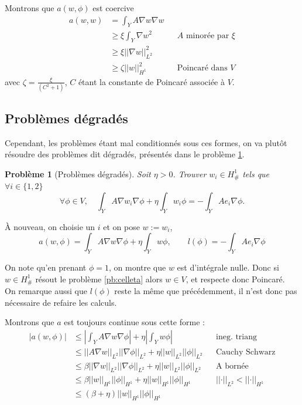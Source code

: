 \documentclass[11pt]{article}
\newtheorem{pb}{Problème}
\newcommand{\norm}[1]{\left|\left|#1\right|\right|}
\newcommand{\Hd}{H^1_{\#}}
\begin{document}
Montrons que $a(w, \phi)$ est coercive
\begin{align*}
  a(w,w) &= \int_Y A \nabla w  \nabla w \\
         &\geq \xi \int_Y \nabla w^2  && \text{$A$ minorée par $\xi$}\\
         &\geq \xi \norm{\nabla w}^2_{L^2} \\
         &\geq \zeta \norm{w}^2_{H^1} && \text{Poincaré dans $V$} 
\end{align*}
avec $\zeta = \frac{\xi}{(C^2+1)}$, $C$ étant la constante de Poincaré associée à $V$.

\subsection{Problèmes dégradés}

Cependant, les problèmes étant mal conditionnés sous ces formes, on va plutôt résoudre des problèmes dit dégradés, présentés dans le problème
\ref{pb:celleta}.

\begin{pb}[Problèmes dégradés]
  \label{pb:celleta}
  Soit $\eta>0$. Trouver $w_i \in \Hd$ tels que $\forall i \in \{1,2\}$
  \begin{equation}
    \forall \phi \in V, \quad \int_Y A \nabla w_i \nabla \phi + \eta \int_Y w_i \phi = - \int_Y A e_i \nabla \phi.
  \end{equation}
\end{pb}

À nouveau, on choisie un $i$ et on pose $w:=w_i$, 
\[
  a(w,\phi) = \int_Y A \nabla w \nabla \phi + \eta \int_Y w \phi, \qquad
  l(\phi) = -\int_Y A e_i \nabla \phi
\]

On note qu'en prenant $\phi=1$, on montre que $w$ est d'intégrale nulle. Donc si $w\in\Hd$ résout le problème  \autoref{pb:celleta} alors $w\in V$, et respecte donc Poincaré.  \\
On remarque aussi que $l(\phi)$ reste la même que précédemment, il n'est donc pas nécessaire de refaire les calculs. 

Montrons que $a$ est toujours continue sous cette forme :
\begin{align*}
  \big|a(w,\phi)\big| &\leq \left| \int_Y A \nabla w \nabla \phi \right| + \eta \left| \int_Y  w \phi \right| && \mbox{ineg. triang} \\
                   &\leq \norm{A\nabla w}_{L^2} \norm{\nabla \phi}_{L^2} + \eta \norm{w}_{L^2} \norm{\phi}_{L^2} && \mbox{Cauchy Schwarz} \\
                   &\leq \beta \norm{\nabla w}_{L^2} \norm{\nabla \phi}_{L^2} + \eta \norm{w}_{L^2} \norm{\phi}_{L^2} && \mbox{A bornée} \\
                   &\leq \beta \norm{w}_{H^1} \norm{\phi}_{H^1} + \eta \norm{w}_{H^1} \norm{\phi}_{H^1} && \norm{\cdot}_{L^2}<\norm{\cdot}_{H^1} \\
                   &\leq (\beta + \eta) \norm{w}_{H^1} \norm{\phi}_{H^1}
\end{align*}
\end{document}
